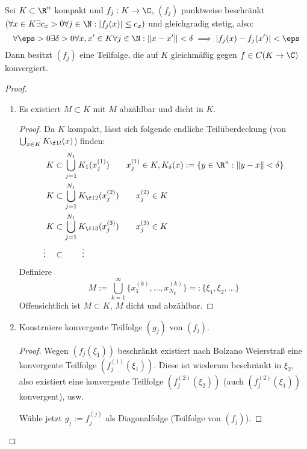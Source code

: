 \documentclass{mycourse}
\begin{document}
\begin{st} \label{1.29}
	Sei $K \subset \R^n$ kompakt und $f_j : K \to \C$, $(f_j)$ punktweise beschränkt $(\forall x \in K \exists c_x >0 \forall j\in \N : |f_j(x)|\le c_x)$ und gleichgradig stetig, also:
	\[
		\forall \eps > 0 \exists \delta > 0 \forall x,x' \in K \forall j \in \N : \|x-x'\| < \delta \implies |f_j(x)-f_j(x')| < \eps
	\]
	Dann besitzt $(f_j)$ eine Teilfolge, die auf $K$ gleichmäßig gegen $f\in C(K \to \C)$ konvergiert.
	\begin{proof}
		\begin{enumerate}[1)]
			\item
				Es existiert $M \subset K$ mit $M$ abzählbar und dicht in $K$.
				\begin{proof}
					Da $K$ kompakt, lässt sich folgende endliche Teilüberdeckung (von $\bigcup_{x\in K} K_{\f 1l}(x)$) finden:
					\begin{align*}
						K &\subset \bigcup_{j=1}^{N_1} K_1(x_j^{(1)})
						\qquad x_j^{(1)} \in K, K_\delta(x) := \{y \in \R^n : \|y-x\| < \delta \} \\
						K &\subset \bigcup_{j=1}^{N_1} K_{\f 12}(x_j^{(2)})
						\qquad x_j^{(2)} \in K \\
						K &\subset \bigcup_{j=1}^{N_1} K_{\f 13}(x_j^{(3)})
						\qquad x_j^{(3)} \in K \\
						\vdots \quad &\subset \qquad \vdots
					\end{align*}
					Definiere
					\[
						M := \bigcup_{k=1}^\infty \Big\{x_1^{(k)}, \dotsc, x_{N_k}^{(k)}\Big\} =: \{\xi_1, \xi_2, \dotsc \}
					\]
					Offensichtlich ist $M \subset K$, $M$ dicht und abzählbar.
				\end{proof}
			\item
				Konstruiere konvergente Teilfolge $(g_j)$ von $(f_j)$.
				\begin{proof}
					Wegen $(f_j(\xi_1))$ beschränkt existiert nach Bolzano Weierstraß eine konvergente Teilfolge $(f_j^{(1)}(\xi_1))$.
					Diese ist wiederum beschränkt in $\xi_2$, also existiert eine konvergente Teilfolge $(f_j^{(2)}(\xi_2))$ (auch $(f_j^{(2)}(\xi_1))$ konvergent), usw.

					Wähle jetzt $g_j := f_j^{(j)}$ als Diagonalfolge (Teilfolge von $(f_j)$).


\end{proof}
\end{enumerate}
\end{proof}
\end{st}
\end{document}
